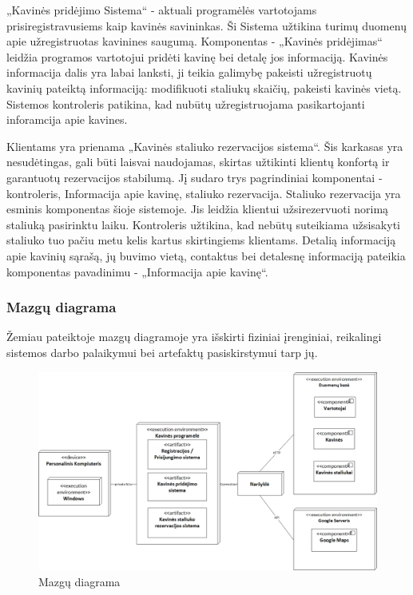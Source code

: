 \documentclass{VUMIFPSkursinis}
\begin{document}
„Kavinės pridėjimo Sistema“ - aktuali programėlės vartotojams prisiregistravusiems kaip kavinės savininkas. Ši Sistema užtikina turimų duomenų apie užregistruotas kavinines saugumą. Komponentas - „Kavinės pridėjimas“ leidžia programos vartotojui pridėti kavinę bei detalę jos informaciją. Kavinės informacija dalis yra labai lanksti, ji teikia galimybę pakeisti užregistruotų kavinių pateiktą informaciją: modifikuoti staliukų skaičių, pakeisti kavinės vietą. Sistemos kontroleris patikina, kad nubūtų užregistruojama pasikartojanti inforamcija apie kavines.

Klientams yra prienama „Kavinės staliuko rezervacijos sistema“. Šis karkasas yra nesudėtingas, gali būti laisvai naudojamas, skirtas užtikinti klientų konfortą ir garantuotų rezervacijos stabilumą. Jį sudaro trys pagrindiniai komponentai - kontroleris, Informacija apie kavinę, staliuko rezervacija. Staliuko rezervacija yra esminis komponentas šioje sistemoje. Jis leidžia klientui užsirezervuoti norimą staliuką pasirinktu laiku. Kontroleris užtikina, kad nebūtų suteikiama užsisakyti staliuko tuo pačiu metu kelis kartus skirtingiems klientams. Detalią informaciją apie kavinių sąrašą, jų buvimo vietą, contaktus bei detalesnę informaciją pateikia komponentas pavadinimu - „Informacija apie kavinę“.  


\subsubsection{Mazgų diagrama}

Žemiau pateiktoje mazgų diagramoje yra išskirti fiziniai įrenginiai, reikalingi sistemos darbo palaikymui bei artefaktų pasiskirstymui tarp jų.
\begin{figure}[H]
    \centering
    \includegraphics[width=\textwidth,height=\textheight,keepaspectratio]{img/Deployment_diagram2} 
    \caption{Mazgų diagrama}
    \label{img:Model}
\end{figure}
\end{document}
